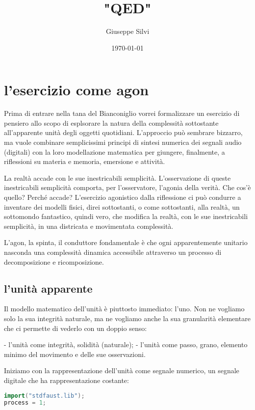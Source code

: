 \documentclass[a4paper,11pt]{article}
\title{"QED"}
\author{Giuseppe Silvi}
\date{\today}
\begin{document}
\maketitle

\section{l'esercizio come agon}

Prima di entrare nella tana del Bianconiglio vorrei formalizzare un
esercizio di pensiero allo scopo di esplsorare la natura della
complessità sottostante all'apparente unità degli oggetti quotidiani.
L'approccio può sembrare bizzarro, ma vuole combinare semplicissimi
principi di sintesi numerica dei segnali audio (digitali) con la loro
modellazione matematica per giungere, finalmente, a riflessioni su
materia e memoria, emersione e attività.

La realtà accade con le sue inestricabili semplicità. L'osservazione di
queste inestricabili semplicità comporta, per l'osservatore, l'agonia
della verità. Che cos'è quello? Perché accade? L'esercizio agonistico
dalla riflessione ci può condurre a inventare dei modelli fisici, direi
sottostanti, o come sottostanti, alla realtà, un sottomondo fantastico,
quindi vero, che modifica la realtà, con le sue inestricabili semplicità,
in una districata e movimentata complessità.

L'agon, la spinta, il conduttore fondamentale è che ogni apparentemente
unitario nasconda una complessità dinamica accessibile attraverso un
processo di decomposizione e ricomposizione.

\subsection{l'unità apparente}

Il modello matematico dell'unità è piuttosto immediato: l'uno. Non ne
vogliamo solo la sua integrità naturale, ma ne vogliamo anche la sua
granularità elementare che ci permette di vederlo con un doppio senso:

 - l'unità come integrità, solidità (naturale);
 - l'unità come passo, grano, elemento minimo del movimento e delle sue
 osservazioni.

Iniziamo con la rappresentazione dell'unità come segnale numerico,
un segnale digitale che ha rappresentazione costante:

\begin{lstlisting}[language=c++]
import("stdfaust.lib");
process = 1;
\end{lstlisting}
\end{document}
